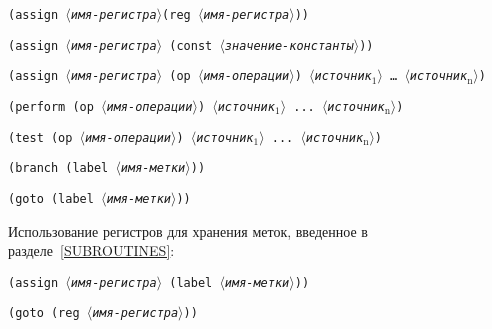 \begin{plainlist}
\sloppy
\item {\tt (assign \textit{$\langle$имя-регистра$\rangle$}(reg \textit{$\langle$имя-регистра$\rangle$}))}%

\item {\tt (assign \textit{$\langle$имя-регистра$\rangle$} (const \textit{$\langle$значение-константы$\rangle$}))}%

\item {\tt (assign \textit{$\langle$имя-регистра$\rangle$} (op \textit{$\langle$имя-операции$\rangle$})
 \textit{$\langle$источник${}_{\mbox{1}}$$\rangle$} \ldots\ \textit{$\langle$ис\-точник${}_{\mbox{n}}$$\rangle$})}%
\sloppy

\item {\tt (perform (op \textit{$\langle$имя-операции$\rangle$}) \textit{$\langle$источник${}_{\mbox{1}}$$\rangle$} ... \textit{$\langle$источник${}_{\mbox{n}}$$\rangle$})%

\item {\tt (test (op \textit{$\langle$имя-операции$\rangle$})  \textit{$\langle$источник${}_{\mbox{1}}$$\rangle$} ... \textit{$\langle$источник${}_{\mbox{n}}$$\rangle$})}%

\item {\tt (branch (label \textit{$\langle$имя-метки$\rangle$})) }%

\item {\tt (goto (label \textit{$\langle$имя-метки$\rangle$}))}} 

\end{plainlist}

Использование регистров для хранения меток, введенное в
разделе~\ref{SUBROUTINES}:

\begin{plainlist}
\item {\tt (assign \textit{$\langle$имя-регистра$\rangle$} (label \textit{$\langle$имя-метки$\rangle$}))}

\item {\tt (goto (reg \textit{$\langle$имя-регистра$\rangle$}))}
\end{plainlist}

